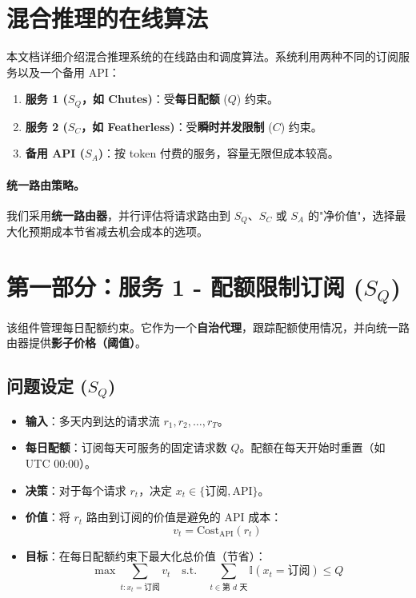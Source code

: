 \documentclass[11pt]{article}
\begin{document}
\section{混合推理的在线算法}
\label{sec:online}

本文档详细介绍混合推理系统的在线路由和调度算法。系统利用两种不同的订阅服务以及一个备用 API：

\begin{enumerate}
  \item \textbf{服务 1 ($S_Q$，如 Chutes)}：受\textbf{每日配额} ($Q$) 约束。
  \item \textbf{服务 2 ($S_C$，如 Featherless)}：受\textbf{瞬时并发限制} ($C$) 约束。
  \item \textbf{备用 API ($S_A$)}：按 token 付费的服务，容量无限但成本较高。
\end{enumerate}

\paragraph{统一路由策略。}
我们采用\textbf{统一路由器}，并行评估将请求路由到 $S_Q$、$S_C$ 或 $S_A$ 的"净价值"，选择最大化预期成本节省减去机会成本的选项。

\section{第一部分：服务 1 - 配额限制订阅 ($S_Q$)}
\label{sec:part1}

该组件管理每日配额约束。它作为一个\textbf{自治代理}，跟踪配额使用情况，并向统一路由器提供\textbf{影子价格（阈值）}。

\subsection{问题设定 ($S_Q$)}

\begin{itemize}
  \item \textbf{输入}：多天内到达的请求流 $r_1, r_2, \dots, r_T$。
  \item \textbf{每日配额}：订阅每天可服务的固定请求数 $Q$。配额在每天开始时重置（如 UTC 00:00）。
  \item \textbf{决策}：对于每个请求 $r_t$，决定 $x_t \in \{ \text{订阅}, \text{API} \}$。
  \item \textbf{价值}：将 $r_t$ 路由到订阅的价值是避免的 API 成本：
  \[ v_t = \text{Cost}_{\text{API}}(r_t) \]
  \item \textbf{目标}：在每日配额约束下最大化总价值（节省）：
  \[ \max \sum_{t: x_t = \text{订阅}} v_t \quad \text{s.t.} \quad \sum_{t \in \text{第 } d \text{ 天}} \mathbb{I}(x_t = \text{订阅}) \le Q \]
\end{itemize}
\end{document}
